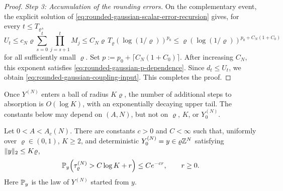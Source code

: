 \documentclass[11pt,reqno,a4paper]{article}
\newcommand{\Pp}{\P}
\begin{document}
\begin{proof}
  \emph{Step 3: Accumulation of the rounding errors.}
  On the complementary event, the explicit solution of
  \cref{eq:rounded-gaussian-scalar-error-recursion} gives, for every
  $t\leq T_\varrho$,
  \begin{equation*}
    U_t
    \leq
    c_N\varrho
    \sum_{s=0}^t
    \prod_{j=s+1}^tM_j
    \leq
    C_N\varrho\,T_\varrho\left(\log(1/\varrho)\right)^{p_0}
    \leq
    \varrho\left(\log(1/\varrho)\right)^{p_0+C_N(1+C_0)}
  \end{equation*}
  for all sufficiently small $\varrho$. Set
  $p:=p_0+\lceil C_N(1+C_0)\rceil$. After increasing $C_N$, this
  exponent satisfies \cref{eq:rounded-gaussian-p-dependence}. Since
  $d_t\leq U_t$, we obtain \cref{eq:rounded-gaussian-coupling-input}. This
  completes the proof.
\end{proof}

Once $Y^{(N)}$ enters a ball of radius $K\varrho$, the number of additional
steps to absorption is $O(\log K)$, with an exponentially decaying upper tail.
The constants below may depend on $(A,N)$, but not on $\varrho$, $K$, or
$Y_0^{(N)}$.

\begin{lemma}
\label{lem:rounded-gaussian-final-absorption}
  Let $0<A<A_c(N)$. There are constants $c>0$ and $C<\infty$ such that,
  uniformly over $\varrho\in(0,1)$, $K\geq2$, and deterministic
  $Y_0^{(N)}=y\in\varrho\mathbb{Z}^N$ satisfying $\lVert y\rVert_2\leq K\varrho$,
  \begin{equation}\label{eq:rounded-gaussian-final-absorption}
    \Pp_y\left(
      \tau_\varrho^{(N)}>C\log K+r
    \right)
    \leq
    C e^{-cr},
    \qquad r\geq0.
  \end{equation}
  Here $\Pp_y$ is the law of $Y^{(N)}$ started from $y$.
\end{lemma}
\end{document}

